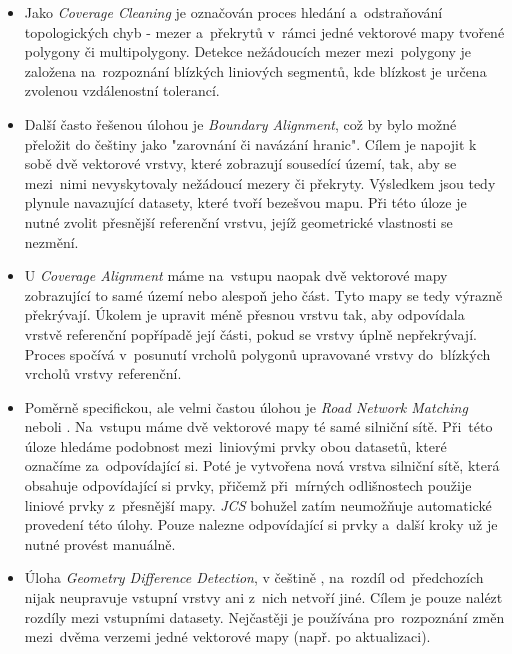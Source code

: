 \begin{itemize}[leftmargin=*]
 \item Jako \textit{Coverage Cleaning} je  označován proces hledání a~odstraňování topologických chyb - mezer a~překrytů v~rámci jedné vektorové mapy tvořené polygony či 
	multipolygony. Detekce nežádoucích mezer mezi~polygony je založena na~rozpoznání blízkých liniových segmentů, kde blízkost je určena zvolenou vzdálenostní tolerancí. 

 \item Další často řešenou úlohou je \textit{Boundary Alignment}, což by bylo možné přeložit do češtiny jako "zarovnání či navázání hranic". Cílem je napojit k sobě dvě 
	vektorové vrstvy, které zobrazují sousedící území, tak, aby se mezi~nimi nevyskytovaly nežádoucí mezery či překryty. Výsledkem jsou tedy plynule navazující datasety,
	které tvoří bezešvou mapu. Při této úloze je nutné zvolit přesnější referenční vrstvu, jejíž geometrické vlastnosti se nezmění.

 \item U \textit{Coverage Alignment} máme na~vstupu naopak dvě vektorové mapy zobrazující to samé území nebo alespoň jeho část. Tyto mapy se tedy výrazně překrývají. Úkolem
	je upravit méně přesnou vrstvu tak, aby odpovídala vrstvě referenční popřípadě její části, pokud se vrstvy úplně nepřekrývají. Proces spočívá v~posunutí vrcholů
	polygonů upravované vrstvy do~blízkých vrcholů vrstvy referenční.

 \item Poměrně specifickou, ale velmi častou úlohou je \textit{Road Network Matching} neboli . Na~vstupu máme dvě vektorové mapy té samé silniční
	sítě. Při~této úloze hledáme podobnost mezi~liniovými prvky obou datasetů, které označíme za~odpovídající si. Poté je vytvořena nová vrstva silniční sítě, která
	obsahuje odpovídající si prvky, přičemž při~mírných odlišnostech použije liniové prvky z~přesnější mapy. \textit{JCS} bohužel zatím neumožňuje automatické provedení
	této úlohy. Pouze nalezne odpovídající si prvky a~další kroky už je nutné provést manuálně.

\item Úloha \textit{Geometry Difference Detection}, v češtině , na~rozdíl od~předchozích nijak neupravuje vstupní vrstvy ani z~nich netvoří jiné.
	Cílem je pouze nalézt rozdíly mezi vstupními datasety. Nejčastěji je používána pro~rozpoznání změn mezi~dvěma verzemi jedné vektorové mapy (např. po aktualizaci).
\end{itemize}

